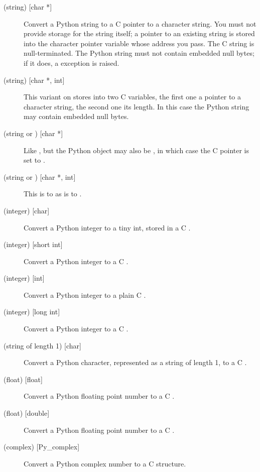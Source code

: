 \documentclass{manual}
\begin{document}
\begin{description}

\item[ (string) {[char *]}]
Convert a Python string to a C pointer to a character string.  You
must not provide storage for the string itself; a pointer to an
existing string is stored into the character pointer variable whose
address you pass.  The C string is null-terminated.  The Python string
must not contain embedded null bytes; if it does, a 
exception is raised.

\item[ (string) {[char *, int]}]
This variant on  stores into two C variables, the first one
a pointer to a character string, the second one its length.  In this
case the Python string may contain embedded null bytes.

\item[ (string or ) {[char *]}]
Like , but the Python object may also be , in which
case the C pointer is set to \NULL{}.

\item[ (string or ) {[char *, int]}]
This is to  as  is to .

\item[ (integer) {[char]}]
Convert a Python integer to a tiny int, stored in a C .

\item[ (integer) {[short int]}]
Convert a Python integer to a C .

\item[ (integer) {[int]}]
Convert a Python integer to a plain C .

\item[ (integer) {[long int]}]
Convert a Python integer to a C .

\item[ (string of length 1) {[char]}]
Convert a Python character, represented as a string of length 1, to a
C .

\item[ (float) {[float]}]
Convert a Python floating point number to a C .

\item[ (float) {[double]}]
Convert a Python floating point number to a C .

\item[ (complex) {[Py_complex]}]
Convert a Python complex number to a C  structure.


\end{description}
\end{document}

